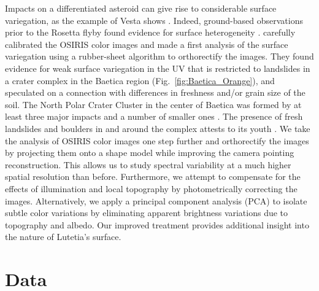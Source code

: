 \documentclass[3p,authoryear]{elsarticle}
\begin{document}
Impacts on a differentiated asteroid can give rise to considerable surface variegation, as the example of Vesta shows \citep{R12}. Indeed, ground-based observations prior to the Rosetta flyby found evidence for surface heterogeneity \citep{N07,L10,P10}. \citet{Mg12} carefully calibrated the OSIRIS color images and made a first analysis of the surface variegation using a rubber-sheet algorithm to orthorectify the images. They found evidence for weak surface variegation in the UV that is restricted to landslides in a crater complex in the Baetica region (Fig.~\ref{fig:Baetica_Orange}), and speculated on a connection with differences in freshness and/or grain size of the soil. The North Polar Crater Cluster in the center of Baetica was formed by at least three major impacts and a number of smaller ones \citep{M12,T12}. The presence of fresh landslides and boulders in and around the complex attests to its youth \citep{K12}. We take the analysis of OSIRIS color images one step further and orthorectify the images by projecting them onto a shape model \citep{P12} while improving the camera pointing reconstruction. This allows us to study spectral variability at a much higher spatial resolution than before. Furthermore, we attempt to compensate for the effects of illumination and local topography by photometrically correcting the images. Alternatively, we apply a principal component analysis (PCA) to isolate subtle color variations by eliminating apparent brightness variations due to topography and albedo. Our improved treatment provides additional insight into the nature of Lutetia's surface.


\section{Data}
\label{sec:data}
\end{document}
